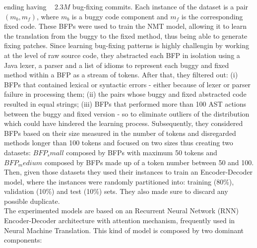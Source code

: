 ending having ~ 2.3\(M\) bug-fixing commits.
Each instance of the dataset is a pair $(m_b, m_f)$, where $m_b$ is a buggy code component and $m_f$ is the
corresponding fixed code. These BFPs were used to train the NMT model, allowing it to learn the translation
from the buggy to the fixed method, thus being able to generate fixing patches. Since learning bug-fixing
patterns is highly challengin by working at the level of raw source code, they abstracted 
each BFP in isolation using a Java lexer, a parser and a list of idioms to represent each buggy and fixed method 
within a BFP as a stream of tokens. After that, they filtered out: (i) BFPs that contained lexical or syntactic 
errors - either because of lexer or parser failure in processing them; (ii) the pairs whose buggy 
and fixed abstracted code resulted in equal strings; (iii) BFPs that performed more than 100 AST actions between the buggy 
and fixed version - so to eliminate outliers of the distribution which could have hindered
the learning process. Subsequently, they considered BFPs based on their size measured
in the number of tokens and disregarded methods longer than 100 tokens and focused on two sizes thus creating 
two datasets: \(BFP_small\) composed by BFPs with maximum 50 tokens and \(BFP_medium\)
composed by BFPs made up of a token number between 50 and 100.
Then, given those datasets they used their instances to train an Encoder-Decoder
model, where the instances were randomly partitioned into: training (80\%), validation (10\%) and 
test (10\%) sets. They also made sure to discard any possible duplicate.\\
The experimented models are based on an Recurrent Neural Network (RNN) Encoder-Decoder
architecture with attention mechanism, frequently used in Neural Machine Translation. 
This kind of model is composed by two
dominant components:

